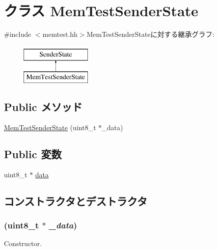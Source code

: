 \hypertarget{classMemTest_1_1MemTestSenderState}{
\section{クラス MemTestSenderState}
\label{classMemTest_1_1MemTestSenderState}
}


{\ttfamily \#include $<$memtest.hh$>$}MemTestSenderStateに対する継承グラフ:\begin{figure}[H]
\begin{center}
\leavevmode
\includegraphics[height=2cm]{classMemTest_1_1MemTestSenderState}
\end{center}
\end{figure}
\subsection*{Public メソッド}
\begin{DoxyCompactItemize}
\item 
\hyperlink{classMemTest_1_1MemTestSenderState_ac1aed13b7cea674ee7a32f870a2bdc99}{MemTestSenderState} (uint8\_\-t $\ast$\_\-data)
\end{DoxyCompactItemize}
\subsection*{Public 変数}
\begin{DoxyCompactItemize}
\item 
uint8\_\-t $\ast$ \hyperlink{classMemTest_1_1MemTestSenderState_abe222f6d3581e7920dcad5306cc906a8}{data}
\end{DoxyCompactItemize}


\subsection{コンストラクタとデストラクタ}
\hypertarget{classMemTest_1_1MemTestSenderState_ac1aed13b7cea674ee7a32f870a2bdc99}{
\subsubsection[{MemTestSenderState}]{ (uint8\_\-t $\ast$ {\em \_\-data})}}
\label{classMemTest_1_1MemTestSenderState_ac1aed13b7cea674ee7a32f870a2bdc99}
Constructor. 


